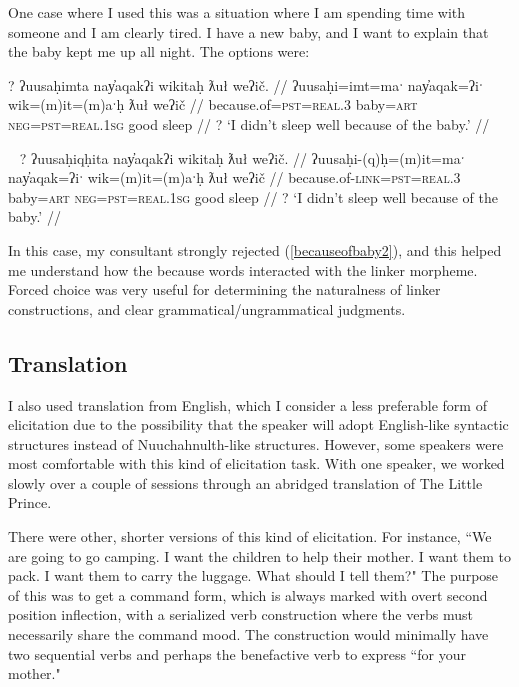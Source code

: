 One case where I used this was a situation where I am spending time with someone and I am clearly tired. I have a new baby, and I want to explain that the baby kept me up all night. The options were:

\ex \label{becauseofbaby1}
\begingl
\glpreamble ? ʔuusaḥimta nay̓aqakʔi wikitaḥ ƛuł weʔič. //
\gla ʔuusaḥi=imt=maˑ nay̓aqak=ʔiˑ wik=(m)it=(m)aˑḥ ƛuł weʔič //
\glb because.of=\textsc{pst}=\textsc{real.3} baby=\textsc{art} \textsc{neg}=\textsc{pst}=\textsc{real.1sg} good sleep //
\glft ? `I didn't sleep well because of the baby.' //
\endgl
\xe

\ex~ \label{becauseofbaby2}
\begingl
\glpreamble ? ʔuusaḥiqḥita nay̓aqakʔi wikitaḥ ƛuł weʔič. //
\gla ʔuusaḥi-(q)ḥ=(m)it=maˑ nay̓aqak=ʔiˑ wik=(m)it=(m)aˑḥ ƛuł weʔič //
\glb because.of-\textsc{link}=\textsc{pst}=\textsc{real.3} baby=\textsc{art} \textsc{neg}=\textsc{pst}=\textsc{real.1sg} good sleep //
\glft ? `I didn't sleep well because of the baby.' //
\endgl
\xe

In this case, my consultant strongly rejected (\ref{becauseofbaby2}), and this helped me understand how the because words interacted with the linker morpheme. Forced choice was very useful for determining the naturalness of linker constructions, and clear grammatical/ungrammatical judgments.

\subsection{Translation}

I also used translation from English, which I consider a less preferable form of elicitation due to the possibility that the speaker will adopt English-like syntactic structures instead of Nuuchahnulth-like structures. However, some speakers were most comfortable with this kind of elicitation task. With one speaker, we worked slowly over a couple of sessions through an abridged translation of The Little Prince.

There were other, shorter versions of this kind of elicitation. For instance, ``We are going to go camping. I want the children to help their mother. I want them to pack. I want them to carry the luggage. What should I tell them?" The purpose of this was to get a command form, which is always marked with overt second position inflection, with a serialized verb construction where the verbs must necessarily share the command mood. The construction would minimally have two sequential verbs and perhaps the benefactive verb to express ``for your mother."

